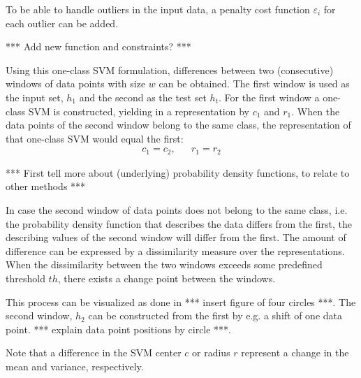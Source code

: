 To be able to handle outliers in the input data, a penalty cost function $\varepsilon_i$ for each outlier can be added.

*** Add new function and constraints? ***

Using this one-class SVM formulation, differences between two (consecutive) windows of data points with size $w$ can be obtained.
The first window is used as the input set, $h_1$ and the second as the test set $h_t$.
For the first window a one-class SVM is constructed, yielding in a representation by $c_1$ and $r_1$.
When the data points of the second window belong to the same class, the representation of that one-class SVM would equal the first:
\begin{equation}
\begin{aligned}
  c_1 = c_2, & &  r_1 = r_2
\end{aligned}
\end{equation}

*** First tell more about (underlying) probability density functions, to relate to other methods ***

In case the second window of data points does not belong to the same class, i.e. the probability density function that describes the data differs from the first, the describing values of the second window will differ from the first.
The amount of difference can be expressed by a dissimilarity measure over the representations.
When the dissimilarity between the two windows exceeds some predefined threshold $th$, there exists a change point between the windows.

This process can be visualized as done in *** insert figure of four circles ***. The second window, $h_2$ can be constructed from the first by e.g. a shift of one data point. *** explain data point positions by circle ***.

Note that a difference in the SVM center $c$ or radius $r$ represent a change in the mean and variance, respectively.

